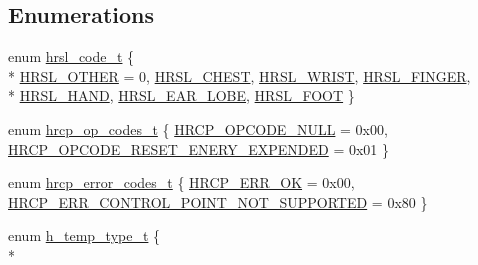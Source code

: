 \subsection*{Enumerations}
\begin{DoxyCompactItemize}
\item 
enum \hyperlink{group___b_l_e_ga142ef314a313f7071c544be2939c13a3}{hrsl\-\_\-code\-\_\-t} \{ \\*
\hyperlink{group___b_l_e_gga142ef314a313f7071c544be2939c13a3a1fef127f1d4f2ed5625f5cf201319869}{H\-R\-S\-L\-\_\-\-O\-T\-H\-E\-R} = 0, 
\hyperlink{group___b_l_e_gga142ef314a313f7071c544be2939c13a3a6646a23f8ba502cee080a9a747349dae}{H\-R\-S\-L\-\_\-\-C\-H\-E\-S\-T}, 
\hyperlink{group___b_l_e_gga142ef314a313f7071c544be2939c13a3a69db22e836192e959df20b9d7e322460}{H\-R\-S\-L\-\_\-\-W\-R\-I\-S\-T}, 
\hyperlink{group___b_l_e_gga142ef314a313f7071c544be2939c13a3a677a2bce35979f3240d4c031b4504b3e}{H\-R\-S\-L\-\_\-\-F\-I\-N\-G\-E\-R}, 
\\*
\hyperlink{group___b_l_e_gga142ef314a313f7071c544be2939c13a3a374b43fb17807d51232d35ef7b53dd5f}{H\-R\-S\-L\-\_\-\-H\-A\-N\-D}, 
\hyperlink{group___b_l_e_gga142ef314a313f7071c544be2939c13a3a500c23539eeecc80f5d0895db91dee94}{H\-R\-S\-L\-\_\-\-E\-A\-R\-\_\-\-L\-O\-B\-E}, 
\hyperlink{group___b_l_e_gga142ef314a313f7071c544be2939c13a3a3d7f638193a65fda264d54f05ee0275f}{H\-R\-S\-L\-\_\-\-F\-O\-O\-T}
 \}
\item 
enum \hyperlink{group___b_l_e_ga05f649a99eaf5a7d66679d1b1d30c2e3}{hrcp\-\_\-op\-\_\-codes\-\_\-t} \{ \hyperlink{group___b_l_e_gga05f649a99eaf5a7d66679d1b1d30c2e3a6dc2044db07e52a55ab5d9b2f4b520ba}{H\-R\-C\-P\-\_\-\-O\-P\-C\-O\-D\-E\-\_\-\-N\-U\-L\-L} = 0x00, 
\hyperlink{group___b_l_e_gga05f649a99eaf5a7d66679d1b1d30c2e3ad8b7d6844bd068d48dd91bb711719f98}{H\-R\-C\-P\-\_\-\-O\-P\-C\-O\-D\-E\-\_\-\-R\-E\-S\-E\-T\-\_\-\-E\-N\-E\-R\-Y\-\_\-\-E\-X\-P\-E\-N\-D\-E\-D} = 0x01
 \}
\item 
enum \hyperlink{group___b_l_e_ga5daf78dd74d394978ce4ceda96dd7492}{hrcp\-\_\-error\-\_\-codes\-\_\-t} \{ \hyperlink{group___b_l_e_gga5daf78dd74d394978ce4ceda96dd7492a6dc6b7445a9e853714c84fb090fdf291}{H\-R\-C\-P\-\_\-\-E\-R\-R\-\_\-\-O\-K} = 0x00, 
\hyperlink{group___b_l_e_gga5daf78dd74d394978ce4ceda96dd7492a7940ba0f1405e01e785b902274d80ff1}{H\-R\-C\-P\-\_\-\-E\-R\-R\-\_\-\-C\-O\-N\-T\-R\-O\-L\-\_\-\-P\-O\-I\-N\-T\-\_\-\-N\-O\-T\-\_\-\-S\-U\-P\-P\-O\-R\-T\-E\-D} = 0x80
 \}
\item 
enum \hyperlink{group___b_l_e_ga7fa712ec2096ff24507538b50e2f51e0}{h\-\_\-temp\-\_\-type\-\_\-t} \{ \\*

\end{DoxyCompactItemize}

